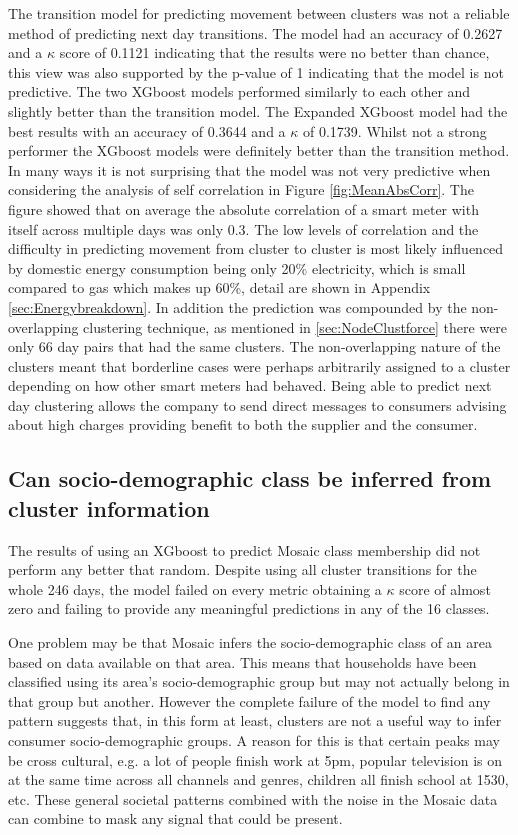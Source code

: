 The transition model for predicting movement between clusters was not a reliable method of predicting next day transitions. The model had an accuracy of 0.2627 and a $\kappa$ score of 0.1121 indicating that the results were no better than chance, this view was also supported by the p-value of 1 indicating that the model is not predictive. The two XGboost models performed similarly to each other and slightly better than the transition model. The Expanded XGboost model had the best results with an accuracy of 0.3644 and a $\kappa$ of 0.1739. Whilst not a strong performer the XGboost models were definitely better than the transition method. In many ways it is not surprising that the model was not very predictive when considering the analysis of self correlation in Figure \ref{fig:MeanAbsCorr}. The figure showed that on average the absolute correlation of a smart meter with itself across multiple days was only 0.3. The low levels of correlation and the difficulty in predicting movement from cluster to cluster is most likely influenced by domestic energy consumption being only 20\% electricity, which is small compared to gas which makes up 60\%, detail are shown in Appendix \ref{sec:Energybreakdown}. In addition the prediction was compounded by the non-overlapping clustering technique, as mentioned in \ref{sec:NodeClustforce} there were only 66 day pairs that had the same clusters. The non-overlapping nature of the clusters meant that borderline cases were perhaps arbitrarily assigned to a cluster depending on how other smart meters had behaved. Being able to predict next day clustering allows the company to send direct messages to consumers advising about high charges providing benefit to both the supplier and the consumer.

\subsection{Can socio-demographic class be inferred from cluster information}
The results of using an XGboost to predict Mosaic class membership did not perform any better that random. Despite using all cluster transitions for the whole 246 days, the model failed on every metric obtaining a $\kappa$ score of almost zero and failing to provide any meaningful predictions in any of the 16 classes. 

One problem may be that Mosaic infers the socio-demographic class of an area based on data available on that area. This means that households have been classified using its area's  socio-demographic group but may not actually belong in that group but another. However the complete failure of the model to find any pattern suggests that, in this form at least, clusters are not a useful way to infer consumer socio-demographic groups. A reason for this is that certain peaks may be cross cultural, e.g. a lot of people finish work at 5pm, popular television is on at the same time across all channels and genres, children all finish school at 1530, etc. These general societal patterns combined with the noise in the Mosaic data can combine to mask any signal that could be present. 

